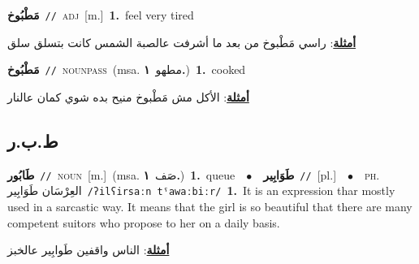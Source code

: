 \documentclass[10pt,a4paper,twoside]{article} %
\begin{document}
\begin{multicols}{2}
{{{{{{{{\setlength\topsep{0pt}\textbf{\foreignlanguage{arabic}{مَطْبُوخ}}\ {\color{gray}\texttt{//}\color{black}}\ \textsc{adj}\ [m.]\ \textbf{1.}~feel very tired\  \begin{flushright}\color{gray}\foreignlanguage{arabic}{\textbf{\underline{\foreignlanguage{arabic}{أمثلة}}}: راسي مَطْبوخ من بعد ما أشرفت عالصبة الشمس كانت بتسلق سلق}\end{flushright}\color{black}} \vspace{2mm}

{\setlength\topsep{0pt}\textbf{\foreignlanguage{arabic}{مَطْبُوخ}}\ {\color{gray}\texttt{//}\color{black}}\ \textsc{noun\textunderscore pass}\ \color{gray}(msa. \foreignlanguage{arabic}{مطهو}~\foreignlanguage{arabic}{\textbf{١.}})\color{black}\ \textbf{1.}~cooked\  \begin{flushright}\color{gray}\foreignlanguage{arabic}{\textbf{\underline{\foreignlanguage{arabic}{أمثلة}}}: الأكل مش مَطْبوخ منيح بده شوي كمان عالنار}\end{flushright}\color{black}} \vspace{2mm}

\vspace{-3mm}
\subsection*{\color{blue}\foreignlanguage{arabic}{ط.ب.ر}\color{blue}{}} 

{\setlength\topsep{0pt}\textbf{\foreignlanguage{arabic}{طَابُور}}\ {\color{gray}\texttt{//}\color{black}}\ \textsc{noun}\ [m.]\ \color{gray}(msa. \foreignlanguage{arabic}{صَف}~\foreignlanguage{arabic}{\textbf{١.}})\color{black}\ \textbf{1.}~queue\ \ $\bullet$\ \ \setlength\topsep{0pt}\textbf{\foreignlanguage{arabic}{طَوَابِير}}\ {\color{gray}\texttt{//}\color{black}}\ [pl.]\ \ $\bullet$\ \ \textsc{ph.} \color{gray} \foreignlanguage{arabic}{العِرْسَان طَوَابِير}\color{black}\ {\color{gray}\texttt{/{\sffamily ʔilʕirsaːn tˤawaːbiːr}/}\color{black}}\ \textbf{1.}~It is an expression thar mostly used in a sarcastic way. It means that the girl is so beautiful that there are many competent suitors who propose to her on a daily basis.\  \begin{flushright}\color{gray}\foreignlanguage{arabic}{\textbf{\underline{\foreignlanguage{arabic}{أمثلة}}}: الناس واقفين طَوابِير عالخبز}\end{flushright}\color{black}} \vspace{2mm}

}}}}}}}
\end{multicols}
\end{document}
